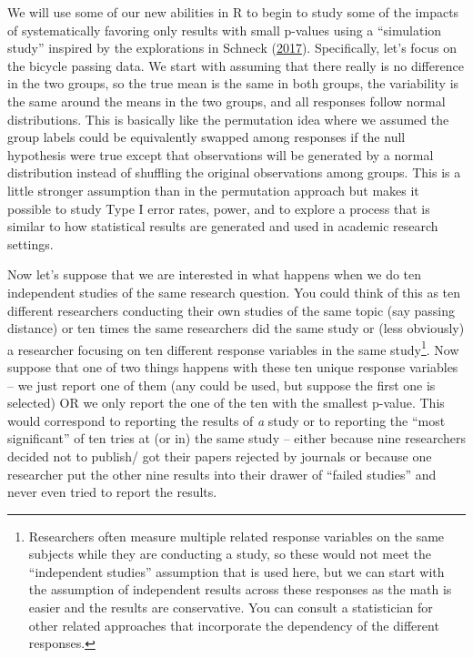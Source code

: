 \documentclass[
]{book}
\begin{document}
\indent We will use some of our new abilities in R to begin to study some of the impacts of systematically favoring only results with small p-values using a ``simulation study'' inspired by the explorations in Schneck (\protect\hyperlink{ref-Schneck2017}{2017}).  Specifically, let's focus on the bicycle passing data. We start with assuming that there really is no difference in the two groups, so the true mean is the same in both groups, the variability is the same around the means in the two groups, and all responses follow normal distributions. This is basically like the permutation idea where we assumed the group labels could be equivalently swapped among responses if the null hypothesis were true except that observations will be generated by a normal distribution instead of shuffling the original observations among groups. This is a little stronger assumption than in the permutation approach but makes it possible to study Type I error rates, power, and to explore a process that is similar to how statistical results are generated and used in academic research settings.

\indent Now let's suppose that we are interested in what happens when we do ten independent studies of the same research question. You could think of this as ten different researchers conducting their own studies of the same topic (say passing distance) or ten times the same researchers did the same study or (less obviously) a researcher focusing on ten different response variables in the same study\footnote{Researchers often measure multiple related response variables on the same subjects while they are conducting a study, so these would not meet the ``independent studies'' assumption that is used here, but we can start with the assumption of independent results across these responses as the math is easier and the results are conservative. You can consult a statistician for other related approaches that incorporate the dependency of the different responses.}. Now suppose that one of two things happens with these ten unique response variables -- we just report one of them (any could be used, but suppose the first one is selected) OR we only report the one of the ten with the smallest p-value. This would correspond to reporting the results of \emph{a} study or to reporting the ``most significant'' of ten tries at (or in) the same study -- either because nine researchers decided not to publish/ got their papers rejected by journals or because one researcher put the other nine results into their drawer of ``failed studies'' and never even tried to report the results.
\end{document}

